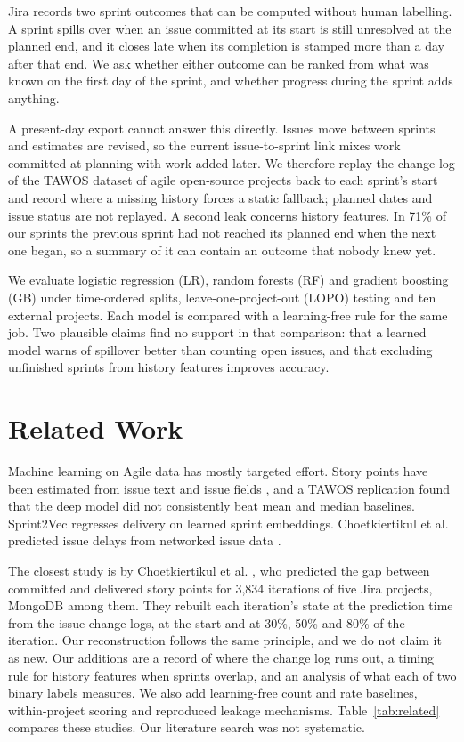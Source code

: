 \documentclass[conference]{IEEEtran}
\begin{document}
Jira records two sprint outcomes that can be computed without human labelling. A sprint spills over when an issue committed at its start is still unresolved at the planned end, and it closes late when its completion is stamped more than a day after that end. We ask whether either outcome can be ranked from what was known on the first day of the sprint, and whether progress during the sprint adds anything.

A present-day export cannot answer this directly. Issues move between sprints and estimates are revised, so the current issue-to-sprint link mixes work committed at planning with work added later. We therefore replay the change log of the TAWOS dataset of agile open-source projects \cite{r6} back to each sprint's start and record where a missing history forces a static fallback; planned dates and issue status are not replayed. A second leak concerns history features. In 71\% of our sprints the previous sprint had not reached its planned end when the next one began, so a summary of it can contain an outcome that nobody knew yet.

We evaluate logistic regression (LR), random forests (RF) and gradient boosting (GB) under time-ordered splits, leave-one-project-out (LOPO) testing and ten external projects. Each model is compared with a learning-free rule for the same job. Two plausible claims find no support in that comparison: that a learned model warns of spillover better than counting open issues, and that excluding unfinished sprints from history features improves accuracy.

\section{Related Work}

Machine learning on Agile data has mostly targeted effort. Story points have been estimated from issue text \cite{r1} and issue fields \cite{r2}, and a TAWOS replication \cite{r3} found that the deep model did not consistently beat mean and median baselines. Sprint2Vec \cite{r4} regresses delivery on learned sprint embeddings. Choetkiertikul et al. predicted issue delays from networked issue data \cite{r25}.

The closest study is by Choetkiertikul et al. \cite{r19}, who predicted the gap between committed and delivered story points for 3,834 iterations of five Jira projects, MongoDB among them. They rebuilt each iteration's state at the prediction time from the issue change logs, at the start and at 30\%, 50\% and 80\% of the iteration. Our reconstruction follows the same principle, and we do not claim it as new. Our additions are a record of where the change log runs out, a timing rule for history features when sprints overlap, and an analysis of what each of two binary labels measures. We also add learning-free count and rate baselines, within-project scoring and reproduced leakage mechanisms. Table~\ref{tab:related} compares these studies. Our literature search was not systematic.
\end{document}
